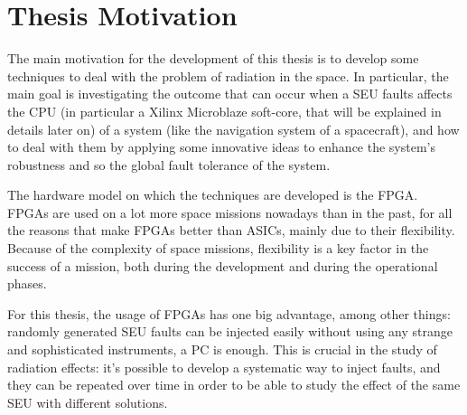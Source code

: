 \section{Thesis Motivation}
The main motivation for the development of this thesis is to develop some techniques to deal with the problem of radiation in the space. In particular, the main goal is investigating the outcome that can occur when a SEU faults affects the CPU (in particular a Xilinx Microblaze soft-core, that will be explained in details later on) of a system (like the navigation system of a spacecraft), and how to deal with them by applying some innovative ideas to enhance the system's robustness and so the global fault tolerance of the system. \bigskip

The hardware model on which the techniques are developed is the FPGA. FPGAs are used on a lot more space missions nowadays than in the past, for all the reasons that make FPGAs better than ASICs, mainly due to their flexibility. Because of the complexity of space missions, flexibility is a key factor in the success of a mission, both during the development and during the operational phases. \bigskip

For this thesis, the usage of FPGAs has one big advantage, among other things: randomly generated SEU faults can be injected easily without using any strange and sophisticated instruments, a PC is enough. This is crucial in the study of radiation effects: it's possible to develop a systematic way to inject faults, and they can be repeated over time in order to be able to study the effect of the same SEU with different solutions.